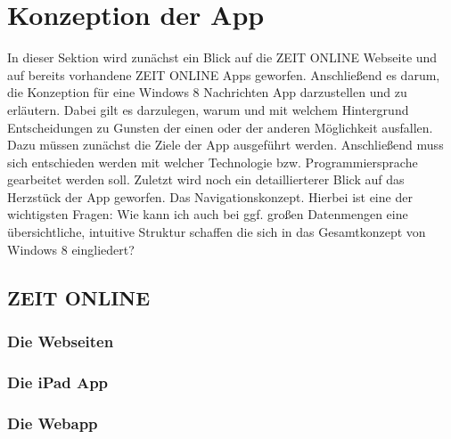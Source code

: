 \documentclass[12pt,a4paper,bibtotoc]{scrartcl}
\begin{document}
\section{Konzeption der App}
\label{sec:konzeption}
In dieser Sektion wird zunächst ein Blick auf die ZEIT ONLINE Webseite und auf bereits vorhandene ZEIT ONLINE Apps geworfen. Anschließend es darum, die Konzeption für eine Windows 8 Nachrichten App darzustellen und zu erläutern. Dabei gilt es darzulegen, warum und mit welchem Hintergrund Entscheidungen zu Gunsten der einen oder der anderen Möglichkeit ausfallen. Dazu müssen zunächst die Ziele der App ausgeführt werden. Anschließend muss sich entschieden werden mit welcher Technologie bzw. Programmiersprache gearbeitet werden soll. Zuletzt wird noch ein detaillierterer Blick auf das Herzstück der App geworfen. Das Navigationskonzept. Hierbei ist eine der wichtigsten Fragen: \glqq Wie kann ich auch bei ggf. großen Datenmengen eine übersichtliche, intuitive Struktur schaffen die sich in das Gesamtkonzept von Windows 8 eingliedert?\grqq  

\subsection{ZEIT ONLINE}
\label{subsec:zeitonline}

\subsubsection{Die Webseiten}
\label{subsubsec:webseiten}

\subsubsection{Die iPad App}
\label{subsubsec:ipadapp}

\subsubsection{Die Webapp}
\label{subsubsec:webapp}
\end{document}
